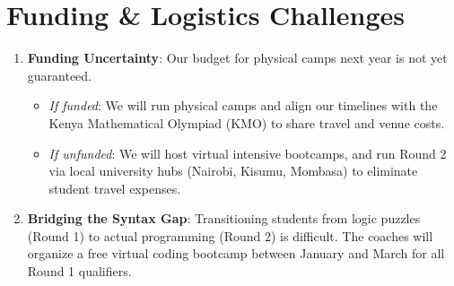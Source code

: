 \documentclass[11pt]{article}
\begin{document}
\section{Funding \& Logistics Challenges}
\begin{enumerate}
    \item \textbf{Funding Uncertainty}: Our budget for physical camps next year is not yet guaranteed.
    \begin{itemize}
        \item \textit{If funded}: We will run physical camps and align our timelines with the Kenya Mathematical Olympiad (KMO) to share travel and venue costs.
        \item \textit{If unfunded}: We will host virtual intensive bootcamps, and run Round 2 via local university hubs (Nairobi, Kisumu, Mombasa) to eliminate student travel expenses.
    \end{itemize}
    \item \textbf{Bridging the Syntax Gap}: Transitioning students from logic puzzles (Round 1) to actual programming (Round 2) is difficult. The coaches will organize a free virtual coding bootcamp between January and March for all Round 1 qualifiers.
\end{enumerate}
\end{document}
